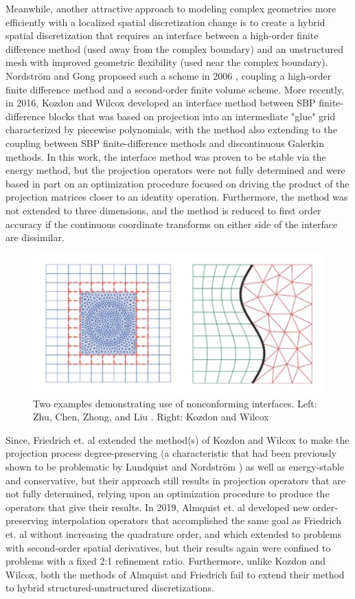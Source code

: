 Meanwhile, another attractive approach to modeling complex geometries more efficiently
with a localized spatial discretization change is to create a hybrid spatial
discretization that requires an interface between a high-order finite difference
method (used away from the complex boundary) and an unstructured mesh with
improved geometric flexibility (used near the complex boundary). Nordstr{\"o}m and Gong
proposed such a scheme in 2006 \cite{nordstrom2006stable}, coupling a high-order finite difference method
and a second-order finite volume scheme. More recently, in 2016, Kozdon and Wilcox
\cite{kozdon2016stable} developed an interface method between SBP finite-difference
blocks that was based on projection into an intermediate "glue" grid characterized by
piecewise polynomials, with the method also extending to the coupling between SBP
finite-difference methods and discontinuous Galerkin methods. In this work, the interface method was proven to be stable via the energy method, but the projection operators were
not fully determined and were based in part on an optimization procedure focused on
driving the product of the projection matrices closer to an identity operation.
Furthermore, the method was not extended to three dimensions, and the method is reduced
to first order accuracy if the continuous coordinate transforms on either side of the
interface are dissimilar.
\begin{figure}
\centering
\includegraphics[width=0.7\linewidth,trim=4 4 4 4,clip]{figures/nonconforming_samples.png}
\caption{Two examples demonstrating use of nonconforming interfaces. Left: Zhu, Chen, Zhong, and Liu \cite{zhu2011hybrid}.
	 Right: Kozdon and Wilcox \cite{kozdon2016stable}}
\label{fig:nonconforming_samples}
\end{figure}
Since, Friedrich et. al \cite{friedrich2018conservative} extended the
method(s) of Kozdon and Wilcox to make the
projection process degree-preserving (a characteristic that had been
previously shown to be problematic by Lundquist and Nordstr{\"o}m \cite{lundquist2016suboptimal}) as well as
energy-stable and conservative, but their approach still results in projection
operators that are not fully determined, relying upon an optimization procedure
to produce the operators that give their results. In 2019, Almquist et. al \cite{almquist2019order} developed new order-preserving interpolation operators that accomplished
the same goal as Friedrich et. al without increasing the quadrature order, and which
extended to problems with second-order spatial derivatives, but their results again
were confined to problems with a fixed 2:1 refinement ratio. Furthermore, unlike Kozdon
and Wilcox, both the methods of Almquist and Friedrich fail to extend their method to hybrid structured-unstructured discretizations.

